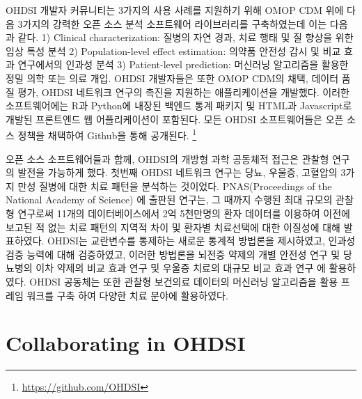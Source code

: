 \documentclass[11pt]{book}
\let\rmarkdownfootnote\footnote%
\def\footnote{\protect\rmarkdownfootnote}
\theoremstyle{definition}
\theoremstyle{definition}
\theoremstyle{definition}
\theoremstyle{remark}
\begin{document}
OHDSI 개발자 커뮤니티는 3가지의 사용 사례를 지원하기 위해 OMOP CDM 위에
다음 3가지의 강력한 오픈 소스 분석 소프트웨어 라이브러리를 구축하였는데
이는 다음과 같다. 1) Clinical characterization: 질병의 자연 경과, 치료
행태 및 질 향상을 위한 임상 특성 분석 2) Population-level effect
estimation: 의약품 안전성 감시 및 비교 효과 연구에서의 인과성 분석 3)
Patient-level prediction: 머신러닝 알고리즘을 활용한 정밀 의학 또는 의료
개입. OHDSI 개발자들은 또한 OMOP CDM의 채택, 데이터 품질 평가, OHDSI
네트워크 연구의 촉진을 지원하는 애플리케이션을 개발했다. 이러한
소프트웨어에는 R과 Python에 내장된 백엔드 통계 패키지 및 HTML과
Javascript로 개발된 프론트엔드 웹 어플리케이션이 포함된다. 모든 OHDSI
소프트웨어들은 오픈 소스 정책을 채택하여 Github을 통해 공개된다.
\footnote{\url{https://github.com/OHDSI}}

오픈 소스 소프트웨어들과 함께, OHDSI의 개방형 과학 공동체적 접근은
관찰형 연구의 발전을 가능하게 했다. 첫번째 OHDSI 네트워크 연구는 당뇨,
우울증, 고혈압의 3가지 만성 질병에 대한 치료 패턴을 분석하는 것이었다.
PNAS(Proceedings of the National Academy of Science) 에 출판된 연구는,
그 때까지 수행된 최대 규모의 관찰형 연구로써 11개의 데이터베이스에서 2억
5천만명의 환자 데이터를 이용하여 이전에 보고된 적 없는 치료 패턴의
지역적 차이 및 환자별 치료선택에 대한 이질성에 대해 발표하였다.
\citep{Hripcsak7329} OHDSI는 교란변수를 통제하는 새로운 통계적 방법론을
제시하였고, \citep{tian_2018} 인과성 검증 능력에 대해 검증하였고,
\citep{schuemie_2018} 이러한 방법론을 뇌전증 약제의 개별 안전성 연구
\citep{duke_2017} 및 당뇨병의 이차 약제의 비교 효과 연구
\citep{vashisht_2018} 및 우울증 치료의 대규모 비교 효과 연구
\citep{schuemie_2018b}에 활용하였다. OHDSI 공동체는 또한 관찰형 보건의료
데이터의 머신러닝 알고리즘을 활용 프레임 워크를 구축 \citep{reps2018}
하여 다양한 치료 분야에 활용하였다.
\citep{johnston_2019, cepeda_2018, reps_2019}

\section{Collaborating in OHDSI}\label{collaborating-in-ohdsi}
\end{document}
